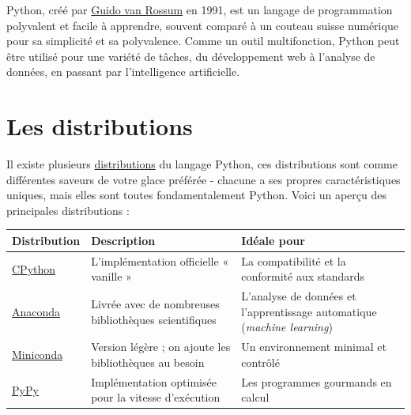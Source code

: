 \documentclass[
  french,
  11pt,
  letterpaper,
  open=any,
  twoside=false,
  french]{scrbook}
\newcounter{none} %
\begin{document}
Python, créé par
\href{https://en.wikipedia.org/wiki/Guido_van_Rossum}{Guido van Rossum}
en 1991, est un langage de programmation polyvalent et facile à
apprendre, souvent comparé à un couteau suisse numérique pour sa
simplicité et sa polyvalence. Comme un outil multifonction, Python peut
être utilisé pour une variété de tâches, du développement web à
l'analyse de données, en passant par l'intelligence artificielle.

\section{Les distributions}\label{les-distributions}

Il existe plusieurs
\href{https://wiki.python.org/moin/PythonDistributions}{distributions}
du langage Python, ces distributions sont comme différentes saveurs de
votre glace préférée - chacune a ses propres caractéristiques uniques,
mais elles sont toutes fondamentalement Python. Voici un aperçu des
principales distributions :

{\def\LTcaptype{none} %
\begin{longtable}[]{@{}
  >{\raggedright\arraybackslash}p{}
  >{\raggedright\arraybackslash}p{}
  >{\raggedright\arraybackslash}p{}@{}}
\toprule\noalign{}
\begin{minipage}[b]{\linewidth}\raggedright
Distribution
\end{minipage} & \begin{minipage}[b]{\linewidth}\raggedright
Description
\end{minipage} & \begin{minipage}[b]{\linewidth}\raggedright
Idéale pour
\end{minipage} \\
\midrule\noalign{}
\endhead
\bottomrule\noalign{}
\endlastfoot
\href{https://www.python.org/downloads/}{CPython} & L'implémentation
officielle « vanille » & La compatibilité et la conformité aux
standards \\
\href{https://www.anaconda.com/download}{Anaconda} & Livrée avec de
nombreuses bibliothèques scientifiques & L'analyse de données et
l'apprentissage automatique (\emph{machine learning}) \\
\href{https://docs.anaconda.com/miniconda/miniconda-install/}{Miniconda}
& Version légère ; on ajoute les bibliothèques au besoin & Un
environnement minimal et contrôlé \\
\href{https://pypy.org/}{PyPy} & Implémentation optimisée pour la
vitesse d'exécution & Les programmes gourmands en calcul \\
\end{longtable}
}
\end{document}
